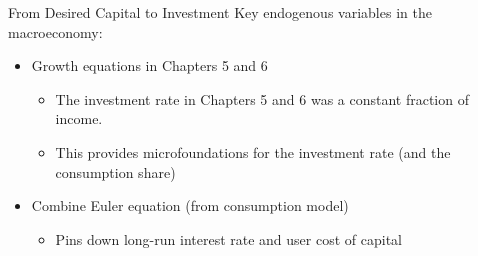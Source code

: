 \documentclass[aspectratio=1610]{beamer}
\begin{document}
\begin{frame}[wide]{From Desired Capital to Investment}
	Key endogenous variables in the macroeconomy:
	\vspace{3mm}
	\begin{itemize}
		\item Growth equations in Chapters 5 and 6
		\begin{itemize}
			\item The investment rate in Chapters 5 and 6 was a constant fraction of income.
			\item This provides microfoundations for the investment rate (and the consumption share)
		\end{itemize}
		\vspace{3mm}
		\item Combine Euler equation (from consumption model)
		\begin{itemize}
			\item Pins down long-run interest rate and user cost of capital 
		\end{itemize}
	\end{itemize}
\end{frame}
\end{document}
